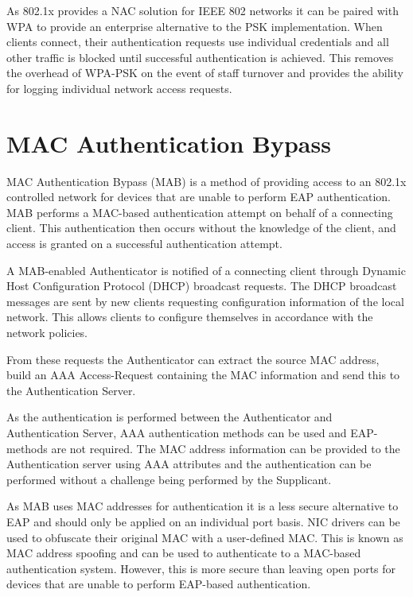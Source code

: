 As 802.1x provides a NAC solution for IEEE 802 networks it can be paired with WPA to provide an enterprise alternative to the PSK implementation. When clients connect, their authentication requests use individual credentials and all other traffic is blocked until successful authentication is achieved. This removes the overhead of WPA-PSK on the event of staff turnover and provides the ability for logging individual network access requests.

\section{MAC Authentication Bypass}
MAC Authentication Bypass (MAB) is a method of providing access to an 802.1x controlled network for devices that are unable to perform EAP authentication. MAB performs a MAC-based authentication attempt on behalf of a connecting client. This authentication then occurs without the knowledge of the client, and access is granted on a successful authentication attempt.

A MAB-enabled Authenticator is notified of a connecting client through Dynamic Host Configuration Protocol (DHCP) broadcast requests. The DHCP broadcast messages are sent by new clients requesting configuration information of the local network. This allows clients to configure themselves in accordance with the network policies. 

From these requests the Authenticator can extract the source MAC address, build an AAA Access-Request containing the MAC information and send this to the Authentication Server. 

As the authentication is performed between the Authenticator and Authentication Server, AAA authentication methods can be used and EAP-methods are not required. The MAC address information can be provided to the Authentication server using AAA attributes and the authentication can be performed without a challenge being performed by the Supplicant.

As MAB uses MAC addresses for authentication\cite{cisco_mab} it is a less secure alternative to EAP and should only be applied on an individual port basis. NIC drivers can be used to obfuscate their original MAC with a user-defined MAC. This is known as MAC address spoofing and can be used to authenticate to a MAC-based authentication system. However, this is more secure than leaving open ports for devices that are unable to perform EAP-based authentication.
